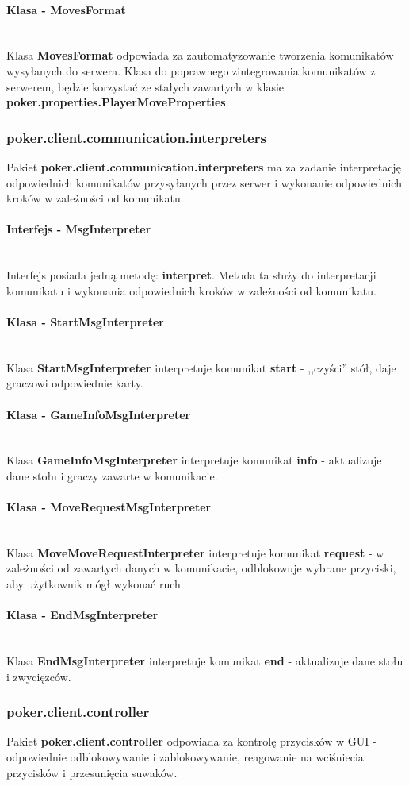 \documentclass{article}
\newcommand{\mparagraph}[1]{\paragraph{#1}\mbox{}\vspace{2mm}\\}
\begin{document}
            \mparagraph{Klasa - MovesFormat}
                Klasa \textbf{MovesFormat} odpowiada za zautomatyzowanie tworzenia komunikatów wysyłanych do serwera.
                Klasa do poprawnego zintegrowania komunikatów z serwerem, będzie korzystać ze stałych zawartych w klasie \textbf{poker.properties.PlayerMoveProperties}.
                
        \subsubsection{poker.client.communication.interpreters}
            Pakiet \textbf{poker.client.communication.interpreters} ma za zadanie interpretację odpowiednich komunikatów przysyłanych przez serwer i wykonanie odpowiednich kroków w zależności od komunikatu.
            
            \mparagraph{Interfejs - MsgInterpreter}
                Interfejs posiada jedną metodę: \textbf{interpret}. Metoda ta służy do interpretacji komunikatu i wykonania odpowiednich kroków w zależności od komunikatu.
            
            \mparagraph{Klasa - StartMsgInterpreter}
                Klasa \textbf{StartMsgInterpreter} interpretuje komunikat \textbf{start} - ,,czyści'' stół, daje graczowi odpowiednie karty.
            
            \mparagraph{Klasa - GameInfoMsgInterpreter}
                Klasa \textbf{GameInfoMsgInterpreter} interpretuje komunikat \textbf{info} - aktualizuje dane stołu i graczy zawarte w komunikacie.
            
            \mparagraph{Klasa - MoveRequestMsgInterpreter}
                Klasa \textbf{MoveMoveRequestInterpreter} interpretuje komunikat \textbf{request} - w zależności od zawartych danych w komunikacie, odblokowuje wybrane przyciski, aby użytkownik mógł wykonać ruch.
            
            \mparagraph{Klasa - EndMsgInterpreter}
                Klasa \textbf{EndMsgInterpreter} interpretuje komunikat \textbf{end} - aktualizuje dane stołu i zwycięzców.
            
        \subsubsection{poker.client.controller}
            Pakiet \textbf{poker.client.controller} odpowiada za kontrolę przycisków w GUI - odpowiednie odblokowywanie i zablokowywanie, reagowanie na wciśniecia przycisków i przesunięcia suwaków.
            
\end{document}
